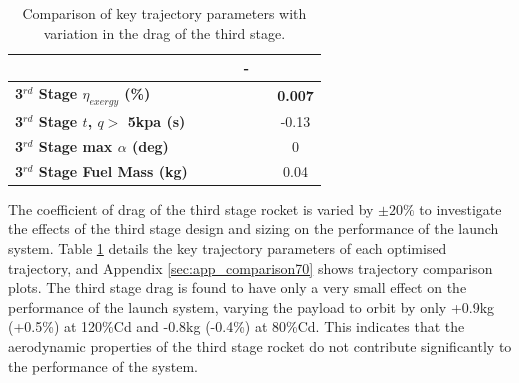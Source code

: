 \begin{table}[ht]
\begin{tabular}{l c c c c c c}
		& \secondFlightTimeCdThreeStandardNoReturn
		& \secondFlightTimeCdThreeOneHundredTenNoReturn
		& \secondFlightTimeCdThreeOneHundredTwentyNoReturn
		& -
		\\
		\hline 
		\textbf{3$^{rd}$ Stage $\eta_{exergy}$ (\%)}
		& \textbf{\thirddExergyEffCdThreeEightyNoReturn}
		& \textbf{\thirddExergyEffCdThreeNinetyNoReturn}
		& \textbf{\thirddExergyEffCdThreeStandardNoReturn}
		& \textbf{\thirddExergyEffCdThreeOneHundredTenNoReturn}
		& \textbf{\thirddExergyEffCdThreeOneHundredTwentyNoReturn}
		& \textbf{0.007}
		\\
		\textbf{3$^{rd}$ Stage $t$, $q >$ 5kpa (s)}
		& \thirdqOverFiveCdThreeEightyNoReturn
		& \thirdqOverFiveCdThreeNinetyNoReturn
		& \thirdqOverFiveCdThreeStandardNoReturn
		& \thirdqOverFiveCdThreeOneHundredTenNoReturn
		& \thirdqOverFiveCdThreeOneHundredTwentyNoReturn
		&-0.13
		\\
		\textbf{3$^{rd}$ Stage max $\alpha$ (deg)}
		& \thirdmaxAoACdThreeEightyNoReturn
		& \thirdmaxAoACdThreeNinetyNoReturn
		& \thirdmaxAoACdThreeStandardNoReturn
		& \thirdmaxAoACdThreeOneHundredTenNoReturn
		& \thirdmaxAoACdThreeOneHundredTwentyNoReturn
		&0
		\\
		\textbf{3$^{rd}$ Stage Fuel Mass (kg)}
		& \thirdmFuelCdThreeEightyNoReturn
		& \thirdmFuelCdThreeNinetyNoReturn
		& \thirdmFuelCdThreeStandardNoReturn
		& \thirdmFuelCdThreeOneHundredTenNoReturn
		& \thirdmFuelCdThreeOneHundredTwentyNoReturn
		&0.04
		\\
		\hline 
	\end{tabular} 
	\caption{Comparison of key trajectory parameters with variation in the drag of the third stage.}
	\label{tab:comparison70}
	
\end{table}

The coefficient of drag of the third stage rocket is varied by $\pm20\%$ to investigate the effects of the third stage design and sizing on the performance of the launch system. Table \ref{tab:comparison70} details the key trajectory parameters of each optimised trajectory, and Appendix \ref{sec:app_comparison70} shows trajectory comparison plots. The third stage drag is found to have only a very small effect on the performance of the launch system, varying the payload to orbit by only +0.9kg (+0.5\%) at 120\%Cd and -0.8kg (-0.4\%) at 80\%Cd. This indicates that the aerodynamic properties of the third stage rocket do not contribute significantly to the performance of the system. 

